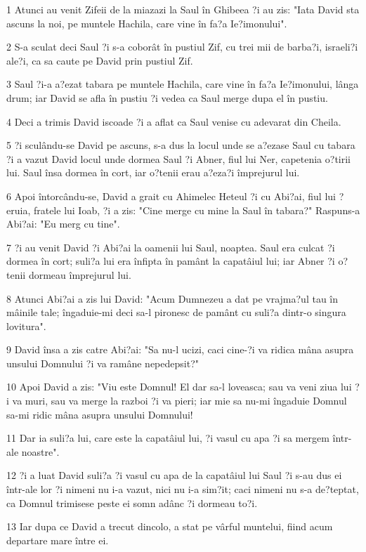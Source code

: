 \par 1 Atunci au venit Zifeii de la miazazi la Saul în Ghibeea ?i au zis: "Iata David sta ascuns la noi, pe muntele Hachila, care vine în fa?a Ie?imonului".
\par 2 S-a sculat deci Saul ?i s-a coborât în pustiul Zif, cu trei mii de barba?i, israeli?i ale?i, ca sa caute pe David prin pustiul Zif.
\par 3 Saul ?i-a a?ezat tabara pe muntele Hachila, care vine în fa?a Ie?imonului, lânga drum; iar David se afla în pustiu ?i vedea ca Saul merge dupa el în pustiu.
\par 4 Deci a trimis David iscoade ?i a aflat ca Saul venise cu adevarat din Cheila.
\par 5 ?i sculându-se David pe ascuns, s-a dus la locul unde se a?ezase Saul cu tabara ?i a vazut David locul unde dormea Saul ?i Abner, fiul lui Ner, capetenia o?tirii lui. Saul însa dormea în cort, iar o?tenii erau a?eza?i împrejurul lui.
\par 6 Apoi întorcându-se, David a grait cu Ahimelec Heteul ?i cu Abi?ai, fiul lui ?eruia, fratele lui Ioab, ?i a zis: "Cine merge cu mine la Saul în tabara?" Raspuns-a Abi?ai: "Eu merg cu tine".
\par 7 ?i au venit David ?i Abi?ai la oamenii lui Saul, noaptea. Saul era culcat ?i dormea în cort; suli?a lui era înfipta în pamânt la capatâiul lui; iar Abner ?i o?tenii dormeau împrejurul lui.
\par 8 Atunci Abi?ai a zis lui David: "Acum Dumnezeu a dat pe vrajma?ul tau în mâinile tale; îngaduie-mi deci sa-l pironesc de pamânt cu suli?a dintr-o singura lovitura".
\par 9 David însa a zis catre Abi?ai: "Sa nu-l ucizi, caci cine-?i va ridica mâna asupra unsului Domnului ?i va ramâne nepedepsit?"
\par 10 Apoi David a zis: "Viu este Domnul! El dar sa-l loveasca; sau va veni ziua lui ?i va muri, sau va merge la razboi ?i va pieri; iar mie sa nu-mi îngaduie Domnul sa-mi ridic mâna asupra unsului Domnului!
\par 11 Dar ia suli?a lui, care este la capatâiul lui, ?i vasul cu apa ?i sa mergem într-ale noastre".
\par 12 ?i a luat David suli?a ?i vasul cu apa de la capatâiul lui Saul ?i s-au dus ei într-ale lor ?i nimeni nu i-a vazut, nici nu i-a sim?it; caci nimeni nu s-a de?teptat, ca Domnul trimisese peste ei somn adânc ?i dormeau to?i.
\par 13 Iar dupa ce David a trecut dincolo, a stat pe vârful muntelui, fiind acum departare mare între ei.
